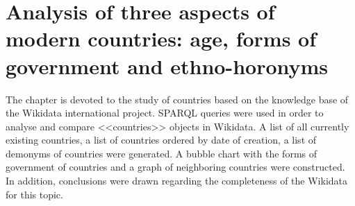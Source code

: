 \setchapterpreamble[u]{\margintoc}
\chapter{Analysis of three aspects of modern countries: age, forms of government and ethno-horonyms}


The chapter is devoted to the study of countries based on the knowledge base of the Wikidata international project. SPARQL queries were used in order to analyse and compare <<countries>> objects in Wikidata. A list of all currently existing countries, a list of countries ordered by date of creation, a list of demonyms of countries were generated. A bubble chart with the forms of government of countries and a graph of neighboring countries were constructed. In addition, conclusions were drawn regarding the completeness of the Wikidata for this topic.